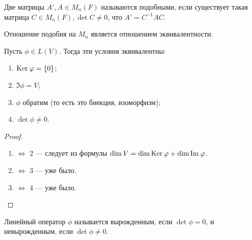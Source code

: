\begin{Def}
    Две матрицы $A', A \in M_n(F)$ называются подобными, если существует такая матрица $C \in M_n(F), \det C \neq 0$, что $A' = C^{-1}AC$.
\end{Def}

\begin{Note}
    Отношение подобия на $M_n$ является отношением эквивалентности. 
\end{Note}

\begin{Suggestion}
    Пусть $\phi \in L(V)$. Тогда эти условия эквивалентны:
    \begin{enumerate}
        \item $\mathrm{Ker}\:\varphi = \{0\}$;
        \item $\Im \phi = V$;
        \item $\phi$ обратим (то есть это биекция, изоморфизм);
        \item $\det \phi \neq 0$.
    \end{enumerate}
\end{Suggestion}

\begin{proof}\ 
    \begin{enumerate}
        \item $\Leftrightarrow$ 2 --- следует из формулы $\dim V = \dim \mathrm{Ker}\: \varphi + \dim \mathrm{Im\:} \varphi$.
        \item $\Leftrightarrow$ 3 --- уже было.
        \item $\Leftrightarrow$ 4 --- уже было.
    \end{enumerate}
\end{proof}

\begin{Def}
    Линейный оператор $\phi$ называется вырожденным, если $\det \phi = 0$, и невырожденным, если $\det \phi \neq 0$.
\end{Def}
